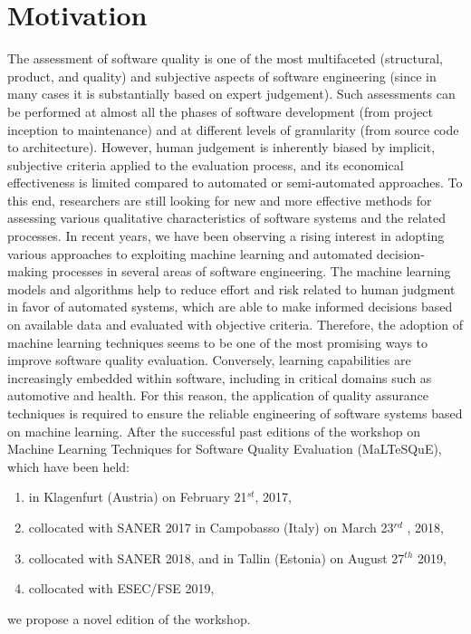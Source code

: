 \section{Motivation}
\label{sec:motivation}
The assessment of software quality is one of the most multifaceted (\eg structural, product, and quality) and subjective aspects of software engineering (since in many cases it is substantially based on expert judgement).
Such assessments can be performed at almost all the phases of software development (from project inception to maintenance) and at different levels of granularity (from source code to architecture).
However, human judgement is inherently biased by implicit, subjective criteria applied to the evaluation process, and its economical effectiveness is limited compared to automated or semi-automated approaches.
To this end, researchers are still looking for new and more effective methods for assessing various qualitative characteristics of software systems and the related processes.
In recent years, we have been observing a rising interest in adopting various approaches to exploiting machine learning and automated decision-making processes in several areas of software engineering.
The machine learning models and algorithms help to reduce effort and risk related to human judgment in favor of automated systems, which are able to make informed decisions based on available data and evaluated with objective criteria.
Therefore, the adoption of machine learning techniques seems to be one of the most promising ways to improve software quality evaluation.
Conversely, learning capabilities are increasingly embedded within software, including in critical domains such as automotive and health.
For this reason, the application of quality assurance techniques is required to ensure the reliable engineering of software systems based on machine learning.
After the successful past editions of the workshop on Machine Learning Techniques for Software Quality Evaluation (MaLTeSQuE), which have been held:
\begin{enumerate}
    \item in Klagenfurt (Austria) on February 21$^{st}$, 2017,
    \item collocated with SANER 2017 in Campobasso (Italy) on March 23$^{rd}$ , 2018,
    \item collocated with SANER 2018, and in Tallin (Estonia) on August 27$^{th}$ 2019,
    \item collocated with ESEC/FSE 2019,
\end{enumerate}
we propose a novel edition of the workshop.
